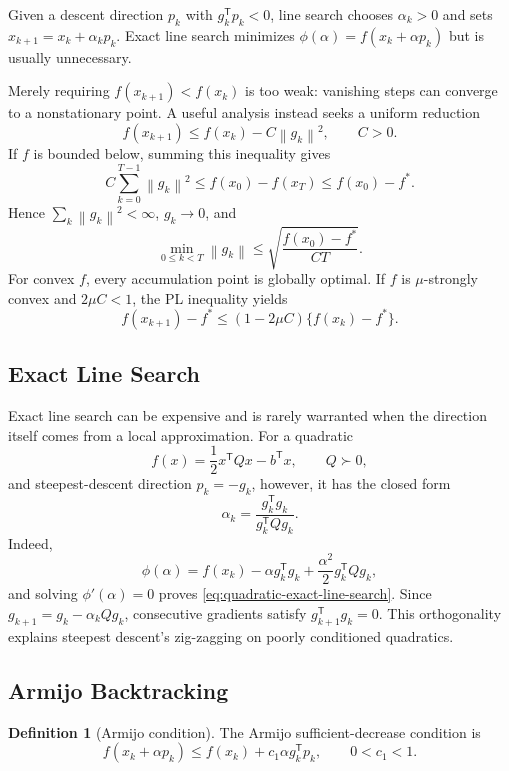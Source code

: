 \documentclass[12pt,oneside]{book}
\numberwithin{equation}{section}
\theoremstyle{definition}
\newtheorem{definition}{Definition}[section]
\theoremstyle{plain}
\theoremstyle{remark}
\newcommand{\norm}[1]{\left\lVert #1 \right\rVert}
\begin{document}
Given a descent direction $p_k$ with $g_k^\mathsf Tp_k<0$, line search chooses
$\alpha_k>0$ and sets $x_{k+1}=x_k+\alpha_kp_k$. Exact line search minimizes
$\phi(\alpha)=f(x_k+\alpha p_k)$ but is usually unnecessary.

Merely requiring $f(x_{k+1})<f(x_k)$ is too weak: vanishing steps can converge
to a nonstationary point. A useful analysis instead seeks a uniform reduction
\begin{equation}
 f(x_{k+1})\leq f(x_k)-C\norm{g_k}^2,\qquad C>0.
 \label{eq:uniform-sufficient-reduction}
\end{equation}
If $f$ is bounded below, summing this inequality gives
\[
 C\sum_{k=0}^{T-1}\norm{g_k}^2
 \leq f(x_0)-f(x_T)\leq f(x_0)-f^*.
\]
Hence $\sum_k\norm{g_k}^2<\infty$, $g_k\to0$, and
\[
 \min_{0\leq k<T}\norm{g_k}
 \leq\sqrt{\frac{f(x_0)-f^*}{CT}}.
\]
For convex $f$, every accumulation point is globally optimal. If $f$ is
$\mu$-strongly convex and $2\mu C<1$, the PL inequality yields
\[
 f(x_{k+1})-f^*
 \leq(1-2\mu C)\{f(x_k)-f^*\}.
\]

\subsection{Exact Line Search}

Exact line search can be expensive and is rarely warranted when the direction
itself comes from a local approximation. For a quadratic
\[
 f(x)=\frac12x^\mathsf TQx-b^\mathsf Tx,\qquad Q\succ0,
\]
and steepest-descent direction $p_k=-g_k$, however, it has the closed form
\begin{equation}
 \alpha_k=\frac{g_k^\mathsf Tg_k}{g_k^\mathsf TQg_k}.
 \label{eq:quadratic-exact-line-search}
\end{equation}
Indeed,
\[
 \phi(\alpha)=f(x_k)-\alpha g_k^\mathsf Tg_k
 +\frac{\alpha^2}{2}g_k^\mathsf TQg_k,
\]
and solving $\phi'(\alpha)=0$ proves
\cref{eq:quadratic-exact-line-search}. Since
$g_{k+1}=g_k-\alpha_kQg_k$, consecutive gradients satisfy
$g_{k+1}^\mathsf Tg_k=0$. This orthogonality explains steepest descent's
zig-zagging on poorly conditioned quadratics.

\subsection{Armijo Backtracking}

\begin{definition}[Armijo condition]
The Armijo sufficient-decrease condition is
\[
 f(x_k+\alpha p_k)
 \leq f(x_k)+c_1\alpha g_k^\mathsf Tp_k,
 \qquad 0<c_1<1.
\]
\end{definition}
\end{document}
